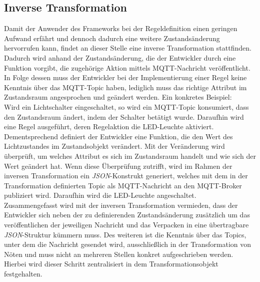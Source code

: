 \subsection{Inverse Transformation}
\label{subsec:inverseTransformation}
    Damit der Anwender des Frameworks bei der Regeldefinition einen geringen Aufwand erfährt und dennoch dadurch eine weitere 
    Zustandsänderung hervorrufen kann, findet an dieser Stelle eine inverse Transformation stattfinden. Dadurch wird anhand 
    der Zustandsänderung, die der Entwickler durch eine Funktion vorgibt, die zugehörige Aktion mittels \acs{MQTT}-Nachricht 
    veröffentlicht. In Folge dessen muss der Entwickler bei der Implementierung einer Regel keine Kenntnis über das 
    \acs{MQTT}-Topic haben, lediglich muss das richtige Attribut im Zustandsraum angesprochen und geändert werden. 
    Ein konkretes Beispiel: 
    \\
    \linebreak
    Wird ein Lichtschalter eingeschaltet, so wird ein \acs{MQTT}-Topic konsumiert, dass den Zustandsraum ändert, indem 
    der Schalter betätigt wurde. Daraufhin wird eine Regel ausgeführt, deren Regelaktion die LED-Leuchte aktiviert. 
    Dementsprechend definiert der Entwickler eine Funktion, die den Wert des Lichtzustandes im Zustandsobjekt verändert. 
    Mit der Veränderung wird überprüft, um welches Attribut es sich im Zustandsraum handelt und wie sich der Wert geändert hat. 
    Wenn diese Überprüfung zutrifft, wird im Rahmen der inversen Transformation ein \textit{JSON}-Konstrukt generiert, welches 
    mit dem in der Transformation definierten Topic als \acs{MQTT}-Nachricht an den \acs{MQTT}-Broker publiziert wird. 
    Daraufhin wird die LED-Leuchte angeschaltet. 
    \\
    \linebreak
    Zusammengefasst wird mit der inversen Transformation vermieden, dass der Entwickler sich neben der zu definierenden 
    Zustandsänderung zusätzlich um das veröffentlichen der jeweiligen Nachricht und das Verpacken in eine übertragbare 
    \textit{JSON}-Struktur kümmern muss. Des weiteren ist die Kenntnis über das Topics, unter dem die Nachricht 
    gesendet wird, ausschließlich in der Transformation von Nöten und muss nicht an mehreren Stellen konkret 
    aufgeschrieben werden. Hierbei wird dieser Schritt zentralisiert in dem Transformationsobjekt festgehalten. 
%

